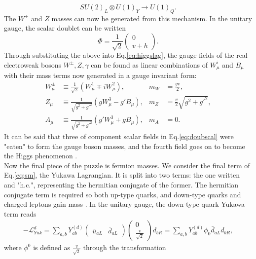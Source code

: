\documentclass[a4paper,12pt]{article}
\begin{document}
\begin{equation}
    \label{eq:symbreak}
    SU(2)_L\otimes U(1)_Y \to U(1)_Q.
\end{equation}
The $W^\pm$ and $Z$ masses can now be generated from this mechanism. 
In the unitary gauge, the scalar doublet can be written
\begin{equation}
    \label{eq:unig}
    \Phi = \frac{1}{\sqrt{2}}\begin{pmatrix}0\\v+h\end{pmatrix}.
\end{equation}
Through substituting the above into Eq.\eqref{eq:higgslag}, the gauge fields of the real electroweak bosons $W^{\pm},Z,\gamma$ can be found as linear combinations of $W^i_\mu$ and $B_\mu$ with their mass terms now generated in a gauge invariant form:
\begin{align}
    \label{eq:gagmix}
    W^\pm_\mu &\equiv \frac{1}{\sqrt{2}}(W_\mu^1 \mp iW_\mu^2), & m_W &= \frac{gv}{2}, \\
    Z_\mu &\equiv \frac{1}{\sqrt{g^2+g'^2}}(gW^3_\mu-g'B_\mu), & m_Z &= \frac{v}{2}\sqrt{g^2+g'^2},\\
    A_\mu &\equiv \frac{1}{\sqrt{g^2+g'^2}}(g'W_\mu^3+gB_\mu), & m_A &= 0.
\end{align}
It can be said that three of component scalar fields in Eq.\eqref{eq:doubscal} were "eaten" to form the gauge boson masses, and the fourth field goes on to become the Higgs phenomenon \cite{schwartz}.\\
Now the final piece of the puzzle is fermion masses. 
We consider the final term of Eq.\eqref{eq:sm}, the Yukawa Lagrangian. 
It is split into two terms: the one written and "h.c.", representing the hermitian conjugate of the former.
The hermitian conjugate term is required so both up-type quarks, and down-type quarks and charged leptons gain mass \cite{kane}. 
In the unitary gauge, the down-type quark Yukawa term reads
\begin{align}
    \label{eq:yuk}
    -\mathcal{L}_{Yuk}^d = \sum_{a,b} Y^{(d)}_{ab} \begin{pmatrix} \bar{u}_{aL} & \bar{d}_{aL}\end{pmatrix}\begin{pmatrix}0\\\frac{v}{\sqrt{2}}\end{pmatrix}d_{bR} = \sum_{a,b}Y^{(d)}_{ab}\phi_0\bar{d}_{aL}d_{bR},
\end{align}
where $\phi^0$ is defined as $\frac{v}{\sqrt{2}}$ through the transformation
\end{document}
